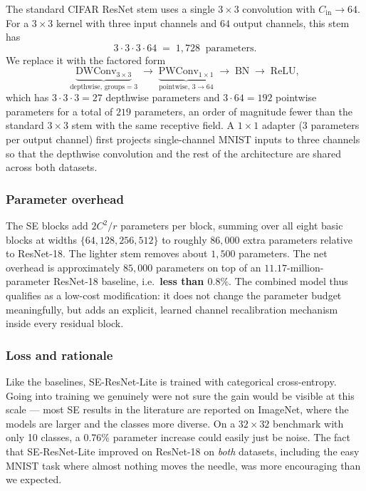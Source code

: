 \documentclass[conference,10pt]{IEEEtran}
\begin{document}
The standard CIFAR ResNet stem uses a single $3\!\times\!3$
convolution with $C_{\text{in}}\!\to\!64$. For a $3\!\times\!3$ kernel
with three input channels and $64$ output channels, this stem has
\[
  3 \cdot 3 \cdot 3 \cdot 64 \;=\; 1{,}728 \;\;\text{parameters.}
\]
We replace it with the factored form
\[
  \underbrace{\textrm{DWConv}_{3\times3}}_{\text{depthwise, groups}=3} \;\to\;
  \underbrace{\textrm{PWConv}_{1\times1}}_{\text{pointwise, }3\to64} \;\to\;
  \textrm{BN} \;\to\; \textrm{ReLU},
\]
which has $3\cdot 3\cdot 3 = 27$ depthwise parameters and
$3\cdot 64 = 192$ pointwise parameters for a total of $219$
parameters, an order of magnitude fewer than the standard
$3\!\times\!3$ stem with the same receptive field. A $1\!\times\!1$
adapter (3 parameters per output channel) first projects single-channel
MNIST inputs to three channels so that the depthwise convolution and
the rest of the architecture are shared across both datasets.

\subsubsection*{Parameter overhead}
The SE blocks add $2C^2/r$ parameters per block, summing over all eight
basic blocks at widths $\{64, 128, 256, 512\}$ to roughly
$86{,}000$ extra parameters relative to ResNet-18. The lighter stem
removes about $1{,}500$ parameters. The net overhead is approximately
$85{,}000$ parameters on top of an $11.17$-million-parameter ResNet-18
baseline, i.e.\ \textbf{less than $0.8\%$}. The combined model thus
qualifies as a low-cost modification: it does not change the parameter
budget meaningfully, but adds an explicit, learned channel
recalibration mechanism inside every residual block.

\subsubsection*{Loss and rationale}

Like the baselines, SE-ResNet-Lite is trained with categorical
cross-entropy. Going into training we genuinely were not sure the
gain would be visible at this scale --- most SE results in the
literature are reported on ImageNet, where the models are larger
and the classes more diverse. On a $32\!\times\!32$ benchmark with
only 10 classes, a 0.76\% parameter increase could easily just be
noise. The fact that SE-ResNet-Lite improved on ResNet-18 on
\emph{both} datasets, including the easy MNIST task where almost
nothing moves the needle, was more encouraging than we expected.
\end{document}
